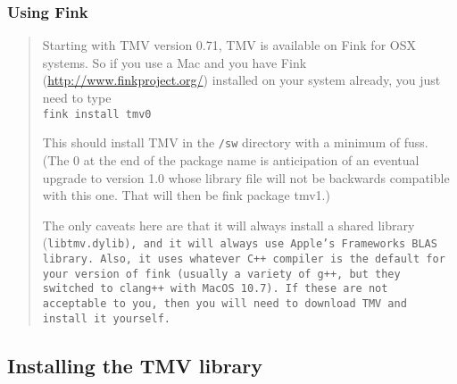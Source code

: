 \subsubsection{Using Fink}

\begin{quote}
Starting with TMV version 0.71, TMV is available on Fink for OSX systems.  So if you use a Mac and you have Fink (\url{http://www.finkproject.org/}) installed on your system already, you just need to type\\
\texttt{fink install tmv0}

This should install TMV in the \texttt{/sw} directory with a minimum of fuss.  (The 0 at the end 
of the package name
is anticipation of an eventual upgrade to version 1.0 whose library file will not be backwards
compatible with this one.  That will then be fink package tmv1.)

The only caveats here are that it will always install a shared library (\tt{libtmv.dylib}), and it will always use Apple's Frameworks BLAS library.  Also, it uses whatever C++ compiler is the default for your version of fink (usually a variety of g++, but they switched to clang++ with MacOS 10.7).  If these are not acceptable to you, then you will need to download TMV and install it yourself.
\end{quote}

\subsection{Installing the TMV library}
\label{Install_Install}

